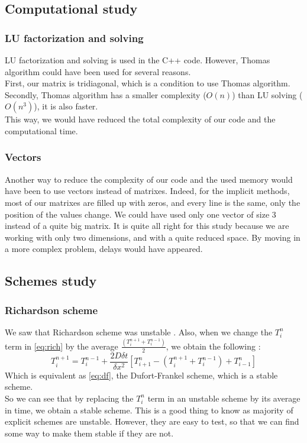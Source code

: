 \documentclass{article}
\begin{document}
        \subsection{Computational study}
            \subsubsection{LU factorization and solving}
                LU factorization and solving is used in the C++ code. However, Thomas algorithm could have been used for several 
                reasons.
                \\
                First, our matrix is tridiagonal, which is a condition to use Thomas algorithm.
                \\
                Secondly, Thomas algorithm has a smaller complexity ($O(n)$) than LU solving ($O(n^3)$), it is also faster.
                \\
                This way, we would have reduced the total complexity of our code and the computational time.
            \subsubsection{Vectors}
                Another way to reduce the complexity of our code and the used memory would have been to use vectors instead
                of matrixes. Indeed, for the implicit methods, most of our matrixes are filled up with zeros, and every line is
                the same, only the position of the values change. We could have used only one vector of size 3 instead of a quite big matrix.
                It is quite all right for this study because we are working with only two dimensions, and with a quite reduced space.
                By moving in a more complex problem, delays would have appeared.
        \subsection{Schemes study}
            \subsubsection{Richardson scheme}
                We saw that Richardson scheme was unstable \cite{rich}. Also, when we change the $T_{i}^n$ term
                in \eqref{eq:rich} by the average $\frac{(T_i^{n+1}+T_i^{n-1})}{2}$, we obtain the following :
                \begin{equation}
                    T_i^{n+1} = T_i^{n-1} + \frac{2D\delta t}{\delta x^2}[T_{i+1}^n - (T_i^{n+1}+T_i^{n-1}) + T_{i-1}^n]
                \end{equation}
                Which is equivalent as \eqref{eq:df}, the Dufort-Frankel scheme, which is a stable scheme.
                \\
                So we can see that by replacing the $T_{i}^n$ term in an unstable scheme by its average in time, we obtain 
                a stable scheme. This is a good thing to know as majority of explicit schemes are unstable. However, they are
                easy to test, so that we can find some way to make them stable if they are not.
\end{document}
